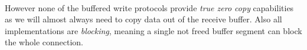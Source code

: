 \paragraph{} However none of the buffered write protocols provide \emph{true zero copy} capabilities as we will almost always
need to copy data out of the receive buffer. Also all implementations are \emph{blocking}, meaning a single not freed buffer
segment can block the whole connection.












